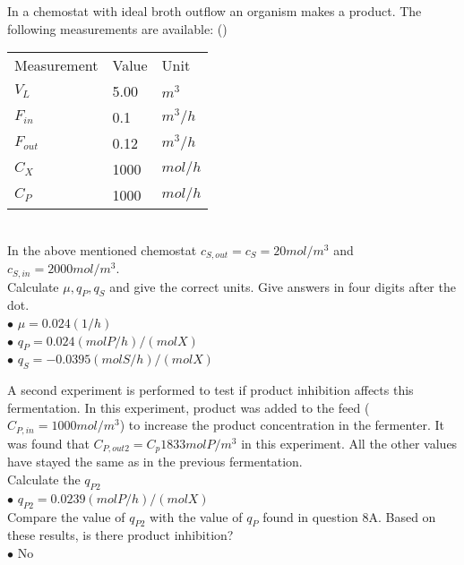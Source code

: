 \documentclass[]{beamer}
\begin{document}
\begin{frame}[shrink] {}
\addtocounter{answers}{1}
\color{blue}
In a chemostat with ideal broth outflow an organism makes a product. The following measurements are available: ()\\
\color{gray}
 \begin{tabular}[ ]{l l l}
Measurement & Value & Unit \\
$V_L$ & 5.00 & $m^3$ \\
$F_{in}$ & 0.1 & $m^{3}/h$ \\
$F_{out}$ & 0.12 & $m^{3}/h$ \\
$C_{X}$ & 1000 & $mol/h$ \\
$C_{P}$ & 1000 & $mol/h$ \\
 \end{tabular} \\
\color{black}
In the above mentioned chemostat $c_{S,out} = c_{S} =20mol/m^3$ and $c_{S,in} = 2000 mol/m^3$. \\[0.3em]
Calculate $\mu, q_P, q_S$ and give the correct units. Give answers in four digits after the dot. \\
\setlength{\parindent}{-0.4cm}
{\color{red}$\bullet$} $\mu=0.024(1/h)$ \\ 
{\color{red}$\bullet$} $q_P=0.024(molP/h)/(molX) $ \\ 
{\color{red}$\bullet$} $q_S=-0.0395 (molS/h)/(molX)$ \\
\end{frame}

\begin{frame}[shrink] {}
  A second experiment is performed to test if product inhibition affects this fermentation. In this experiment, product was added to the feed ($C_{P,in} = 1000 mol/m^3$) to increase the product concentration in the fermenter. It was found that $C_{P,out2} =C_p  1833 mol P/m^3$ in this experiment. All the other values have stayed the same as in the previous fermentation. \\[0.3em]
Calculate the $q_{P2}$ \\ 
{\color{red}$\bullet$} $q_{P2}=0.0239(molP/h)/(molX)$ \\[0.5em] 
Compare the value of $q_{P2}$ with the value of $q_{P}$ found in question 8A. Based on these results, is there product inhibition? \\
{\color{red}$\bullet$} No \\ 
\end{frame}

\end{document}
